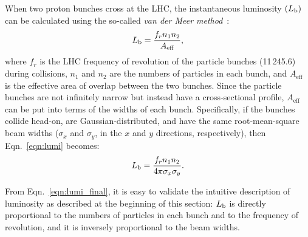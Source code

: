 When two proton bunches cross at the LHC, the instantaneous luminosity $\left( L_\text{b}\right)$ can be calculated using the so-called \emph{van der Meer method}~\cite{LUM-17-003}:
\begin{equation}
    L_\text{b} = \frac{f_r  n_1  n_2}{A_\text{eff}},
    \label{eqn:lumi}
\end{equation}
where $f_r$ is the LHC frequency of revolution of the particle bunches (11\,245.6\Hz) during collisions,
$n_1$ and $n_2$ are the numbers of particles in each bunch,
and $A_\text{eff}$ is the effective area of overlap between the two bunches.
Since the particle bunches are not infinitely narrow but instead have a cross-sectional profile, $A_\text{eff}$ can be put into terms of the widths of each bunch.
Specifically, if the bunches collide head-on, are Gaussian-distributed, and have the same root-mean-square beam widths ($\sigma_x$ and $\sigma_y$, in the $x$ and $y$ directions, respectively), then Eqn.~\ref{eqn:lumi} becomes:
\begin{equation}
    L_\text{b} = \frac{f_r  n_1  n_2}{4\pi \sigma_x \sigma_y}.
    \label{eqn:lumi_final}
\end{equation}

From Eqn.~\ref{eqn:lumi_final}, it is easy to validate the intuitive description of luminosity as described at the beginning of this section:
$L_\text{b}$ is directly proportional to the numbers of particles in each bunch and to the frequency of revolution,
and it is inversely proportional to the beam widths.












